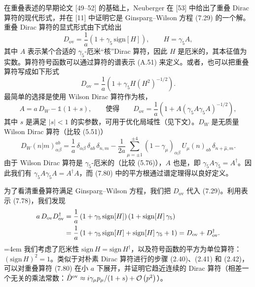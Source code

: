 在重叠表述的早期论文 [49--52] 的基础上，Neuberger 在 [53] 中给出了重叠 Dirac 算符的现代形式，并在 [11] 中证明它是 Ginsparg--Wilson 方程 (7.29) 的一个解。重叠 Dirac 算符的显式形式由下式给出
\begin{equation}
  D_{\mathrm{ov}} = \frac{1}{a}\left(1 + \gamma_5\,\mathrm{sign}[H]\right),
  \qquad
  H = \gamma_5 A,
\end{equation}
其中 $A$ 表示某个合适的 $\gamma_5$-厄米``核''Dirac 算符，因此 $H$ 是厄米的，其本征值为实数。算符符号函数可以通过算符的谱表示 (A.51) 来定义。或者，也可以把重叠算符写成如下形式
\begin{equation}
  D_{\mathrm{ov}} = \frac{1}{a}\left(1 + \gamma_5 H\left(H^2\right)^{-1/2}\right).
\end{equation}
最简单的选择是使用 Wilson Dirac 算符作为核，
\begin{equation}
  A = a\,D_W - \mathbb{1}(1+s), \qquad
  \text{使得} \qquad
  D_{\mathrm{ov}} = \frac{1}{a}\left(1 + A\left(\gamma_5 A\gamma_5 A\right)^{-1/2}\right),
\end{equation}
其中 $s$ 是满足 $|s| < 1$ 的实参数，可用于优化局域性（见下文）。$D_W$ 是无质量 Wilson Dirac 算符（比较 (5.51)）
\begin{equation}
  D_W(n|m)^{ab}_{\alpha\beta} = \frac{1}{a}\,\delta_{\alpha\beta}\,\delta_{ab}\,
  \delta_{n,m}
  - \frac{1}{2a}\sum_{\mu=\pm1}^{\pm4}(1-\gamma_\mu)_{\alpha\beta}\,
    U_\mu(n)_{ab}\,\delta_{n+\hat\mu,m} .
\end{equation}
由于 Wilson Dirac 算符是 $\gamma_5$-厄米的（比较 (5.76)），$A$ 也是，即 $\gamma_5 A\gamma_5 = A^\dagger$。因此我们有 $\gamma_5 A\gamma_5 A = A^\dagger A$，而 (7.80) 中的平方根通过谱定理得以良好定义。

为了看清重叠算符满足 Ginsparg--Wilson 方程，我们把 $D_{\mathrm{ov}}$ 代入 (7.29)。利用表示 (7.78)，我们发现
\begin{align}
  a\,D_{\mathrm{ov}}D_{\mathrm{ov}}^\dagger
  &= \frac{1}{a}\left(1+\gamma_5\,\mathrm{sign}[H]\right)
     \left(1+\mathrm{sign}[H]\,\gamma_5\right) \notag\\
  &= \frac{1}{a}\left(1+\gamma_5\,\mathrm{sign}[H] + \mathrm{sign}[H]\,\gamma_5 + 1\right)
  = D_{\mathrm{ov}} + D_{\mathrm{ov}}^\dagger .
\end{align}
\begingroup\emergencystretch=4em 我们考虑了厄米性 $\mathrm{sign}\,H = \mathrm{sign}\,H^\dagger$，以及符号函数的平方为单位算符：\linebreak[0] $(\mathrm{sign}\,H)^2 = 1$。类似于对朴素 Dirac 算符进行的步骤 (2.40)、(2.41) 和 (2.42)，可以对重叠算符 (7.80) 在小 $a$ 下展开，并证明它趋近连续的 Dirac 算符（相差一个无关的乘法常数：$\hat{D}^{\mathrm{ov}} \approx i\gamma_\mu p_\mu/(1+s) + \mathcal{O}\left(p^2\right)$）。\par\endgroup

